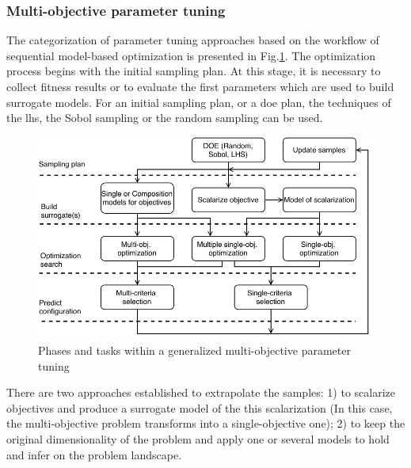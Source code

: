         
        \subsubsection{Multi-objective parameter tuning}

            The categorization of parameter tuning approaches based on the workflow of sequential model-based optimization is presented in Fig.\ref{fig:mo_param_tuning}. The optimization process begins with the initial sampling plan. At this stage, it is necessary to collect fitness results or to evaluate the first parameters which are used to build surrogate models. For an initial sampling plan, or a \gls{doe} plan, the techniques of the \gls{lhs}, the Sobol sampling or the random sampling can be used.
            
            \begin{figure} 
                \centering
                \includegraphics[width=\textwidth]{content/images/tax_mb_tuning}
                \caption[Phases and tasks within a generalized multi-objective parameter tuning]{Phases and tasks within a generalized multi-objective parameter tuning}
                \label{fig:mo_param_tuning}
            \end{figure}

            There are two approaches established to extrapolate the samples: 1) to scalarize objectives and produce a surrogate model of the this scalarization (In this case, the multi-objective problem transforms into a single-objective one); 2) to keep the original dimensionality of the problem and apply one or several models to hold and infer on the problem landscape.

